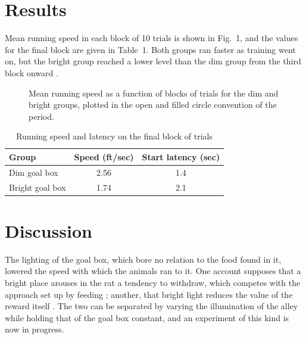 \documentclass[10pt]{article}
\begin{document}
\section{Results}
Mean running speed in each block of 10 trials is shown in Fig.~1, and the
values for the final block are given in Table~1. Both groups ran faster as
training went on, but the bright group reached a lower level than the dim
group from the third block onward \citep[cf.][]{brandt1949}.

\begin{figure}[t]
\centering
{}
\caption{Mean running speed as a function of blocks of trials for the
dim and bright groups, plotted in the open and filled circle convention
of the period.}
\end{figure}

\begin{table}[t]
\caption{Running speed and latency on the final block of trials}
\centering\small
\begin{tabular}{lcc}
\toprule
Group & Speed (ft/sec) & Start latency (sec) \\
\midrule
Dim goal box    & 2.56 & 1.4 \\
Bright goal box & 1.74 & 2.1 \\
\bottomrule
\end{tabular}
\end{table}

\section{Discussion}
The lighting of the goal box, which bore no relation to the food found in
it, lowered the speed with which the animals ran to it. One account
supposes that a bright place arouses in the rat a tendency to withdraw,
which competes with the approach set up by feeding
\citep{marchetti1955}; another, that bright light reduces the value of the
reward itself \citep{strand1957}. The two can be separated by varying the
illumination of the alley while holding that of the goal box constant, and
an experiment of this kind is now in progress.



\end{document}
